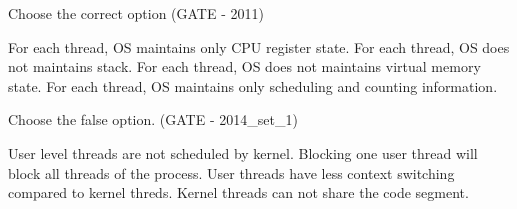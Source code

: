 

\begin{minipage}{\linewidth}

  \question  Choose the correct option (GATE - 2011)

  \begin{choices}
    \choice For each thread, OS maintains only CPU register state.
    \choice For each thread, OS does not maintains  stack.
    \choice For each thread, OS does not maintains  virtual memory state.
    \choice For each thread, OS maintains only scheduling and counting information.
  \end{choices}


\end{minipage}



\begin{minipage}{\linewidth}

  \question  Choose the false option. (GATE - 2014\_set\_1)

  \begin{choices}
    \choice User level threads are not scheduled by kernel.
    \choice Blocking one user thread will block all threads of the process.
    \choice User threads have less context switching compared to kernel threds.
    \choice Kernel threads can not share the code segment.
  \end{choices}


\end{minipage}




\begin{comment}

\begin{minipage}{\linewidth}

  \question  (GATE- )

  \begin{choices}
    \choice
    \choice
    \choice
    \choice
  \end{choices}

\end{minipage}



\end{comment}

